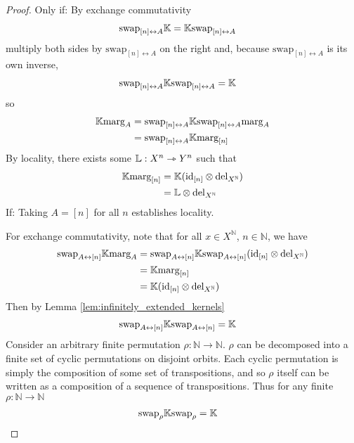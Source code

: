 \begin{proof}
Only if:
By exchange commutativity
\begin{align}
    \text{swap}_{[n]\leftrightarrow A} \mathbb{K} &= \mathbb{K} \text{swap}_{[n]\leftrightarrow A}
\end{align}
multiply both sides by $\text{swap}_{[n]\leftrightarrow A}$ on the right and, because $\text{swap}_{[n]\leftrightarrow A}$ is its own inverse,
\begin{align}
        \text{swap}_{[n]\leftrightarrow A} \mathbb{K}\text{swap}_{[n]\leftrightarrow A} &= \mathbb{K}
\end{align}
so
\begin{align}
    \mathbb{K}\text{marg}_A &= \text{swap}_{[n]\leftrightarrow A} \mathbb{K}\text{swap}_{[n]\leftrightarrow A}\text{marg}_A\\
    &= \text{swap}_{[n]\leftrightarrow A} \mathbb{K}\text{marg}_{[n]}
\end{align}
By locality, there exists some $\mathbb{L}:X^n\rightarrowtriangle Y^n$ such that
\begin{align}
    \mathbb{K} \text{marg}_{[n]} &= \mathbb{K}(\text{id}_{[n]}\otimes \text{del}_{X^{\mathbb{N}}})\\
     &= \mathbb{L}\otimes \mathrm{del}_{X^{\mathbb{N}}}
\end{align}
If:
Taking $A=[n]$ for all $n$ establishes locality.

For exchange commutativity, note that for all $x\in X^{\mathbb{N}}$, $n\in\mathbb{N}$, we have
\begin{align}
    \text{swap}_{A\leftrightarrow [n]} \mathbb{K} \text{marg}_A &= \text{swap}_{A\leftrightarrow [n]} \mathbb{K} \text{swap}_{A\leftrightarrow [n]} (\text{id}_{[n]}\otimes \text{del}_{X^{\mathbb{N}}})\\
     &= \mathbb{K} \text{marg}_{[n]}\\
     &= \mathbb{K}(\text{id}_{[n]}\otimes \text{del}_{X^{\mathbb{N}}})
\end{align}
Then by Lemma \ref{lem:infinitely_extended_kernels}
\begin{align}
    \text{swap}_{A\leftrightarrow [n]} \mathbb{K} \text{swap}_{A\leftrightarrow [n]} &= \mathbb{K}
\end{align}
Consider an arbitrary finite permutation $\rho:\mathbb{N}\to \mathbb{N}$. $\rho$ can be decomposed into a finite set of cyclic permutations on disjoint orbits. Each cyclic permutation is simply the composition of some set of transpositions, and so $\rho$ itself can be written as a composition of a sequence of transpositions. Thus for any finite $\rho:\mathbb{N}\to\mathbb{N}$
\begin{align}
    \text{swap}_{\rho} \mathbb{K} \text{swap}_{\rho} &= \mathbb{K}
\end{align}
\end{proof}

